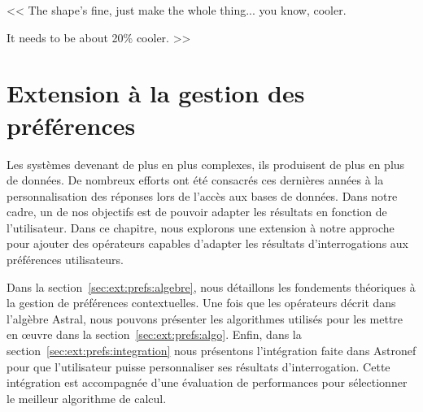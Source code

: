 \begin{savequote}[6cm]
<< The shape's fine, just make the whole thing... you know, cooler. 

\quad It needs to be about 20\% cooler. >>
\end{savequote}
\chapter{Extension à la gestion des préférences}\label{chap:prefs}

Les systèmes devenant de plus en plus complexes, ils produisent de plus en plus de données. De nombreux efforts ont été consacrés ces dernières années à la personnalisation des réponses lors de l'accès aux bases de données. Dans notre cadre, un de nos objectifs est de pouvoir adapter les résultats en fonction de l'utilisateur. Dans ce chapitre, nous explorons une extension à notre approche pour ajouter des opérateurs capables d'adapter les résultats d'interrogations aux préférences utilisateurs.

Dans la section~\ref{sec:ext:prefs:algebre}, nous détaillons les fondements théoriques à la gestion de préférences contextuelles. Une fois que les opérateurs décrit dans l'algèbre Astral, nous pouvons présenter les algorithmes utilisés pour les mettre en œuvre dans la section~\ref{sec:ext:prefs:algo}. Enfin, dans la section~\ref{sec:ext:prefs:integration} nous présentons l'intégration faite dans Astronef pour que l'utilisateur puisse personnaliser ses résultats d'interrogation. Cette intégration est accompagnée d'une évaluation de performances pour sélectionner le meilleur algorithme de calcul.





